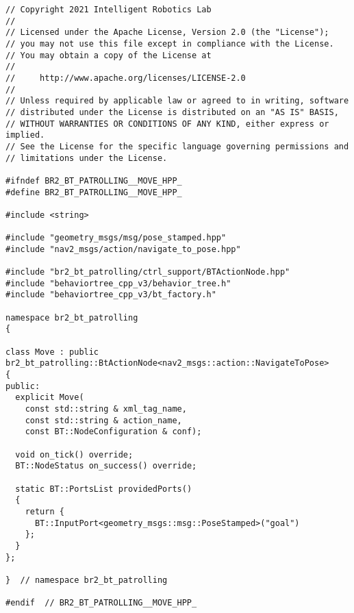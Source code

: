  \footnotesize
\begin{tcolorbox}[sharp corners, colframe=gray!80, colback=LightGray, left=0pt, top=0pt, bottom=0pt, title=\texttt{br2\_bt\_patrolling/include/br2\_bt\_patrolling/Move.hpp}]
  \begin{verbatim}
// Copyright 2021 Intelligent Robotics Lab
//
// Licensed under the Apache License, Version 2.0 (the "License");
// you may not use this file except in compliance with the License.
// You may obtain a copy of the License at
//
//     http://www.apache.org/licenses/LICENSE-2.0
//
// Unless required by applicable law or agreed to in writing, software
// distributed under the License is distributed on an "AS IS" BASIS,
// WITHOUT WARRANTIES OR CONDITIONS OF ANY KIND, either express or implied.
// See the License for the specific language governing permissions and
// limitations under the License.

#ifndef BR2_BT_PATROLLING__MOVE_HPP_
#define BR2_BT_PATROLLING__MOVE_HPP_

#include <string>

#include "geometry_msgs/msg/pose_stamped.hpp"
#include "nav2_msgs/action/navigate_to_pose.hpp"

#include "br2_bt_patrolling/ctrl_support/BTActionNode.hpp"
#include "behaviortree_cpp_v3/behavior_tree.h"
#include "behaviortree_cpp_v3/bt_factory.h"

namespace br2_bt_patrolling
{

class Move : public br2_bt_patrolling::BtActionNode<nav2_msgs::action::NavigateToPose>
{
public:
  explicit Move(
    const std::string & xml_tag_name,
    const std::string & action_name,
    const BT::NodeConfiguration & conf);

  void on_tick() override;
  BT::NodeStatus on_success() override;

  static BT::PortsList providedPorts()
  {
    return {
      BT::InputPort<geometry_msgs::msg::PoseStamped>("goal")
    };
  }
};

}  // namespace br2_bt_patrolling

#endif  // BR2_BT_PATROLLING__MOVE_HPP_
    \end{verbatim}
    \end{tcolorbox}
  \normalsize

